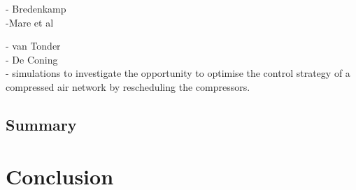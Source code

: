 - Bredenkamp
\\
-Mare et al 

		
		- van Tonder\\
		- De Coning \\-  simulations to investigate the opportunity to optimise the control strategy of a compressed air network by rescheduling the compressors.\\
	\subsection{Summary}
	\label{Shortcomings of previous work}
		\clearpage	
\section{Conclusion}